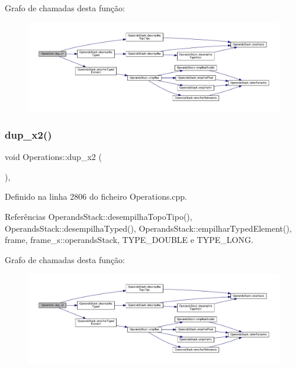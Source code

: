 Grafo de chamadas desta função\+:\nopagebreak
\begin{figure}[H]
\begin{center}
\leavevmode
\includegraphics[width=350pt]{classOperations_a46bab81a4a4bd1eda1c89b0b74f9e014_cgraph}
\end{center}
\end{figure}
\mbox{\label{classOperations_adbba871c60bfb34344f2012936beeb25}} 
\subsubsection{\texorpdfstring{dup\+\_\+x2()}{dup\_x2()}}
{\footnotesize\ttfamily void Operations\+::dup\+\_\+x2 (\begin{DoxyParamCaption}{ }\end{DoxyParamCaption})\hspace{0.3cm}{\ttfamily [static]}, {\ttfamily [private]}}



Definido na linha 2806 do ficheiro Operations.\+cpp.



Referências Operands\+Stack\+::desempilha\+Topo\+Tipo(), Operands\+Stack\+::desempilha\+Typed(), Operands\+Stack\+::empilhar\+Typed\+Element(), frame, frame\+\_\+s\+::operands\+Stack, T\+Y\+P\+E\+\_\+\+D\+O\+U\+B\+LE e T\+Y\+P\+E\+\_\+\+L\+O\+NG.

Grafo de chamadas desta função\+:\nopagebreak
\begin{figure}[H]
\begin{center}
\leavevmode
\includegraphics[width=350pt]{classOperations_adbba871c60bfb34344f2012936beeb25_cgraph}
\end{center}
\end{figure}
\mbox{\label{classOperations_ab63307824c7d6412e0afb1d037b995f1}} 
